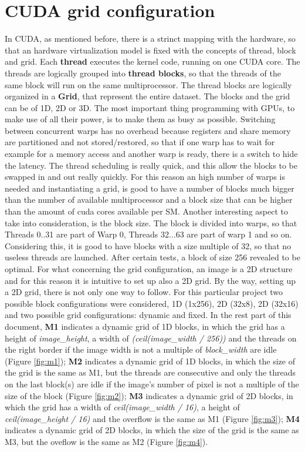 \documentclass[a4paper]{article}
\begin{document}
\section{CUDA grid configuration}
\label{sec:grid}
In CUDA, as mentioned before, there is a strinct mapping with the hardware, so that an hardware virtualization model is fixed with the concepts of thread, block and grid.
Each \textbf{thread} executes the kernel code, running on one CUDA core.
The threads are logically grouped into \textbf{thread blocks}, so that the threads of the same block will run on the same multiprocessor. The thread blocks are logically organized in a \textbf{Grid}, that represent the entire dataset. The blocks and the grid can be of 1D, 2D or 3D.
The most important thing programming with GPUs, to make use of all their power, is to make them as busy as possible. Switching between concurrent warps has no overhead because registers and share memory are partitioned and not stored/restored, so that if one warp has to wait for example for a memory access and another warp is ready, there is a switch to hide the latency. The thread scheduling is really quick, and this allow the blocks to be swapped in and out really quickly. For this reason an high number of warps is needed and instantiating a grid, is good to have a number of blocks much bigger than the number of available multiprocessor and a block size that can be higher than the amount of cuda cores available per SM.
Another interesting aspect to take into consideration, is the block size. The block is divided into warps, so that Threads 0..31 are part of Warp 0, Threads 32...63 are part of warp 1 and so on. Considering this, it is good to have blocks with a size multiple of 32, so that no useless threads are launched. After certain tests, a block of size 256 revealed to be optimal. For what concerning the grid configuration, an image is a 2D structure and for this reason it is intuitive to set up also a 2D grid. By the way, setting up a 2D grid, there is not only one way to follow. For this particular project two possible block configurations were considered, 1D (1x256), 2D (32x8), 2D (32x16) and two possible grid configurations: dynamic and fixed. In the rest part of this document, \textbf{M1} indicates a dynamic grid of 1D blocks, in which the grid has a height of \textit{image\_height}, a width of \textit{(ceil(image\_width / 256))} and the threads on the right border if the image width is not a multiple of \textit{block\_width} are idle (Figure \ref{fig:m1}); \textbf{M2} indicates a dynamic grid of 1D blocks, in which the size of the grid is the same as M1, but the threads are consecutive and only the threads on the last block(s) are idle if the image's number of pixel is not a multiple of the size of the block (Figure \ref{fig:m2}); \textbf{M3} indicates a dynamic grid of 2D blocks, in which the grid has a width of \textit{ceil(image\_width / 16)}, a height of \textit{ceil(image\_height / 16)} and the overflow is the same as M1 (Figure \ref{fig:m3}); \textbf{M4} indicates a dynamic grid of 2D blocks, in which the size of the grid is the same as M3, but the oveflow is the same as M2 (Figure \ref{fig:m4}). 
\end{document}
